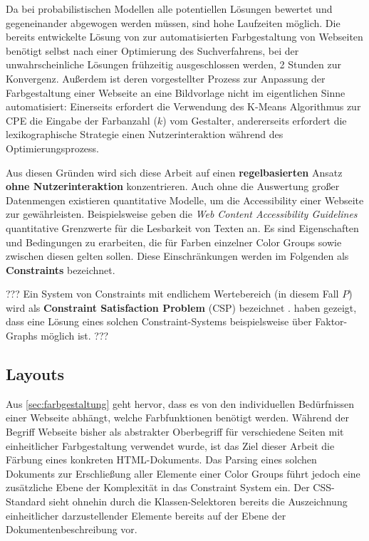 \documentclass[11pt, bibliography=totoc]{scrartcl}
\begin{document}
Da bei probabilistischen Modellen alle potentiellen Lösungen bewertet und gegeneinander abgewogen werden müssen, sind hohe Laufzeiten möglich. Die bereits entwickelte Lösung von \citet{webpage} zur automatisierten Farbgestaltung von Webseiten benötigt selbst nach einer Optimierung des Suchverfahrens, bei der unwahrscheinliche Lösungen frühzeitig ausgeschlossen werden, 2 Stunden zur Konvergenz. Außerdem ist deren vorgestellter Prozess zur Anpassung der Farbgestaltung einer Webseite an eine Bildvorlage nicht im eigentlichen Sinne automatisiert: Einerseits erfordert die Verwendung des K-Means Algorithmus zur CPE die Eingabe der Farbanzahl ($k$) vom Gestalter, andererseits erfordert die lexikographische Strategie einen Nutzerinteraktion während des Optimierungsprozess.

Aus diesen Gründen wird sich diese Arbeit auf einen \textbf{regelbasierten} Ansatz \textbf{ohne Nutzerinteraktion} konzentrieren. Auch ohne die Auswertung großer Datenmengen existieren quantitative Modelle, um die Accessibility einer Webseite zur gewährleisten. Beispielsweise geben die \emph{Web Content Accessibility Guidelines} \citep{wcag} quantitative Grenzwerte für die Lesbarkeit von Texten an. Es sind Eigenschaften und Bedingungen zu erarbeiten, die für Farben einzelner Color Groups sowie zwischen diesen gelten sollen. Diese Einschränkungen werden im Folgenden als \textbf{Constraints} bezeichnet.

???
Ein System von Constraints mit endlichem Wertebereich (in diesem Fall $P$) wird als \textbf{Constraint Satisfaction Problem} (CSP) bezeichnet \citep{constraint-programmierung}. \citet{magazines} haben gezeigt, dass eine Lösung eines solchen Constraint-Systems beispielsweise über Faktor-Graphs möglich ist.
???

\subsection{Layouts}

Aus \autoref{sec:farbgestaltung} geht hervor, dass es von den individuellen Bedürfnissen einer Webseite abhängt, welche Farbfunktionen benötigt werden. Während der Begriff Webseite bisher als abstrakter Oberbegriff für verschiedene Seiten mit einheitlicher Farbgestaltung verwendet wurde, ist das Ziel dieser Arbeit die Färbung eines konkreten HTML-Dokuments. Das Parsing eines solchen Dokuments zur Erschließung aller Elemente einer Color Groups führt jedoch eine zusätzliche Ebene der Komplexität in das Constraint System ein. Der CSS-Standard sieht ohnehin durch die Klassen-Selektoren \citep{css3-selectors} bereits die Auszeichnung einheitlicher darzustellender Elemente bereits auf der Ebene der Dokumentenbeschreibung vor.
\end{document}
